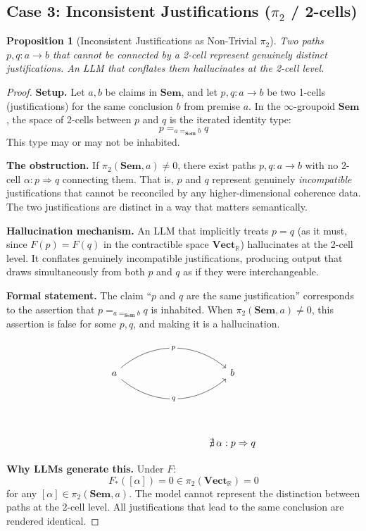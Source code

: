 \documentclass[11pt,a4paper]{article}
\theoremstyle{plain}
\newtheorem{proposition}[theorem]{Proposition}
\theoremstyle{definition}
\theoremstyle{remark}
\newcommand{\Sem}{\mathbf{Sem}}
\newcommand{\Vect}{\mathbf{Vect}}
\newcommand{\R}{\mathbb{R}}
\begin{document}
\subsection{Case 3: Inconsistent Justifications ($\pi_2$ / 2-cells)}
\label{sec:case3}

\begin{proposition}[Inconsistent Justifications as Non-Trivial $\pi_2$]
\label{prop:case3}
Two paths $p, q: a \to b$ that cannot be connected by a 2-cell represent genuinely distinct justifications. An LLM that conflates them hallucinates at the 2-cell level.
\end{proposition}

\begin{proof}
\textbf{Setup.} Let $a, b$ be claims in $\Sem$, and let $p, q: a \to b$ be two 1-cells (justifications) for the same conclusion $b$ from premise $a$. In the $\infty$-groupoid $\Sem$, the space of 2-cells between $p$ and $q$ is the iterated identity type:
\[
p =_{a =_{\Sem} b} q
\]
This type may or may not be inhabited.

\textbf{The obstruction.} If $\pi_2(\Sem, a) \neq 0$, there exist paths $p, q: a \to b$ with no 2-cell $\alpha: p \Rightarrow q$ connecting them. That is, $p$ and $q$ represent genuinely \emph{incompatible} justifications that cannot be reconciled by any higher-dimensional coherence data. The two justifications are distinct in a way that matters semantically.

\textbf{Hallucination mechanism.} An LLM that implicitly treats $p = q$ (as it must, since $F(p) = F(q)$ in the contractible space $\Vect_{\R}$) hallucinates at the 2-cell level. It conflates genuinely incompatible justifications, producing output that draws simultaneously from both $p$ and $q$ as if they were interchangeable.

\textbf{Formal statement.} The claim ``$p$ and $q$ are the same justification'' corresponds to the assertion that $p =_{a =_{\Sem} b} q$ is inhabited. When $\pi_2(\Sem, a) \neq 0$, this assertion is false for some $p, q$, and making it is a hallucination.

\[
\begin{tikzcd}[column sep=3cm, row sep=2cm]
a \arrow[r, bend left=40, "p" description] \arrow[r, bend right=40, "q" description, swap] & b \\
& \nexists\, \alpha : p \Rightarrow q
\end{tikzcd}
\]

\textbf{Why LLMs generate this.} Under $F$:
\[
F_*([\alpha]) = 0 \in \pi_2(\Vect_{\R}) = 0
\]
for any $[\alpha] \in \pi_2(\Sem, a)$. The model cannot represent the distinction between paths at the 2-cell level. All justifications that lead to the same conclusion are rendered identical.
\end{proof}
\end{document}
